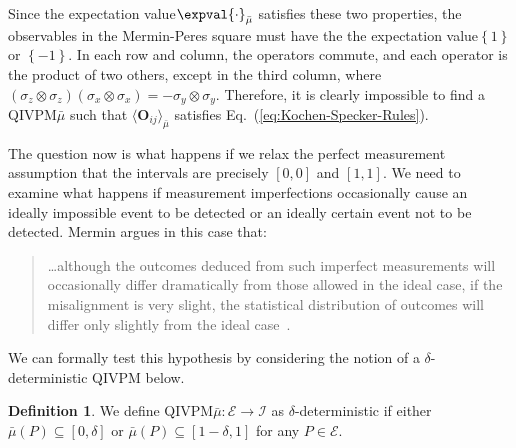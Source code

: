 \documentclass[english,reprint, aps, prl,superscriptaddress, showpacs,
showkeys, longbibliography, amsmath, amssymb]{revtex4-1}
\theoremstyle{plain}
\theoremstyle{definition}
\newtheorem{definition}[thm]{Definition}
\newcommand{\events}{\ensuremath{\mathcal{E}}}
\newcommand{\nb}{\nolinebreak[1] }
\begin{document}
Since the expectation value\nb$\expval{\cdot}_{\bar{\mu}}$ satisfies
these two properties, the observables in the Mermin-Peres square must
have the the expectation value\nb$\left\{ 1\right\} $ or
$\left\{ -1\right\} $.  In each row and column, the operators commute,
and each operator is the product of two others, except in the
third column, where
$\left(\sigma_{z}\otimes\sigma_{z}\right)\left(\sigma_{x}\otimes\sigma_{x}\right)=-\sigma_{y}\otimes\sigma_{y}$.
Therefore, it is clearly impossible to find a QIVPM\nb$\bar{\mu}$ such
that $\langle \mathbf{O}_{ij}\rangle_{\bar \mu}$
satisfies Eq.~(\ref{eq:Kochen-Specker-Rules}).

The question now is what happens if we relax the perfect measurement
assumption that the intervals are precisely $[0,0]$ and
$[1,1]$. We need to examine what happens if
measurement imperfections occasionally cause an
ideally impossible event to be detected or an ideally certain event
not to be detected. Mermin argues in this case that:
\begin{quote}
  \ldots although the outcomes deduced from such imperfect
  measurements will occasionally differ dramatically from those
  allowed in the ideal case, if the misalignment is very slight, the
  statistical distribution of outcomes will differ only slightly from
  the ideal case~\citep{Mermin1999}.
\end{quote}

We can formally test this hypothesis by considering the notion of
a $\delta$-deterministic QIVPM below. 

\begin{definition}\label{def:delta-deterministic}We define
  QIVPM\nb$\bar{\mu}:\events\rightarrow\mathscr{I}$
  as $\delta$-deterministic if either
  $\bar{\mu}\left(P\right)\subseteq\left[0,\delta\right]$ or
  $\bar{\mu}\left(P\right)\subseteq\left[1-\delta,1\right]$ for any
  $P\in\events$.\end{definition}
\end{document}
